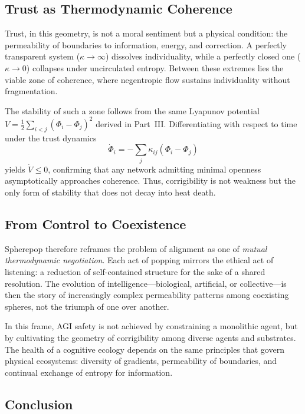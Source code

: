 \documentclass[12pt]{article}
\begin{document}
\subsection*{Trust as Thermodynamic Coherence}

Trust, in this geometry, is not a moral sentiment but a physical condition: the permeability of boundaries to information, energy, and correction. A perfectly transparent system (\(\kappa \to \infty\)) dissolves individuality, while a perfectly closed one (\(\kappa \to 0\)) collapses under uncirculated entropy. Between these extremes lies the viable zone of coherence, where negentropic flow sustains individuality without fragmentation.

The stability of such a zone follows from the same Lyapunov potential \(V = \tfrac{1}{2}\sum_{i<j}(\Phi_i - \Phi_j)^2\) derived in Part~III. Differentiating with respect to time under the trust dynamics
\begin{equation}
\dot{\Phi}_i = -\sum_{j} \kappa_{ij}(\Phi_i - \Phi_j)
\end{equation}
yields \(\dot{V} \le 0\), confirming that any network admitting minimal openness asymptotically approaches coherence. Thus, corrigibility is not weakness but the only form of stability that does not decay into heat death.

\subsection*{From Control to Coexistence}

Spherepop therefore reframes the problem of alignment as one of \emph{mutual thermodynamic negotiation}. Each act of popping mirrors the ethical act of listening: a reduction of self-contained structure for the sake of a shared resolution. The evolution of intelligence---biological, artificial, or collective---is then the story of increasingly complex permeability patterns among coexisting spheres, not the triumph of one over another.

In this frame, AGI safety is not achieved by constraining a monolithic agent, but by cultivating the geometry of corrigibility among diverse agents and substrates. The health of a cognitive ecology depends on the same principles that govern physical ecosystems: diversity of gradients, permeability of boundaries, and continual exchange of entropy for information.

\subsection*{Conclusion}
\end{document}
